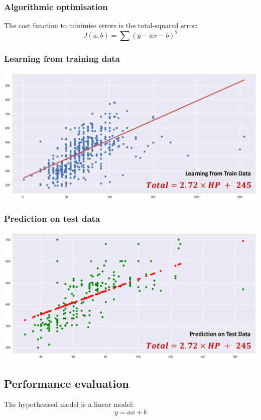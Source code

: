 \documentclass[11pt]{article}
\begin{document}
\subsubsection{Algorithmic optimisation}
\label{sec:org3b005b4}
The cost function to minimise errors is the total-squared error:
\[J(a, b) = \sum(y - ax - b)^2\]
\subsubsection{Learning from training data}
\label{sec:org1ddfe96}
\begin{center}
\includegraphics[width=.9\linewidth]{./images/learning-from-training-data.png}
\end{center}
\subsubsection{Prediction on test data}
\label{sec:org6cc6d0e}
\begin{center}
\includegraphics[width=.9\linewidth]{./images/prediction-on-test-data.png}
\end{center}

 \newpage
\subsection{Performance evaluation}
\label{sec:org21ff230}
The hypothesised model is a linear model:
\[y = ax + b\]
\end{document}

